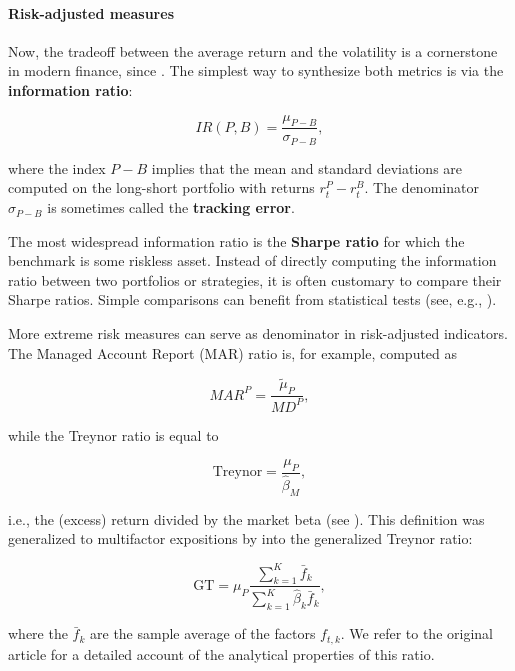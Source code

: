 \paragraph{Risk-adjusted measures}

Now, the tradeoff between the average return and the volatility is a cornerstone in modern finance, since \cite{markowitz1952portfolio}. The simplest way to synthesize both metrics is via the \textbf{information ratio}:

\begin{equation}
IR(P,B)=\frac{\mu_{P-B}}{\sigma_{P-B}},
\end{equation}

where the index $P -B$ implies that the mean and standard deviations are computed on the long-short portfolio with returns $r_t^P -r_t^B$. The denominator $\sigma_{P -B}$ is sometimes called the \textbf{tracking error}.

The most widespread information ratio is the \textbf{Sharpe ratio} \citep{sharpe1966mutual} for which the benchmark is some riskless asset. Instead of directly computing the information ratio between two portfolios or strategies, it is often customary to compare their Sharpe ratios. Simple comparisons can benefit from statistical tests (see, e.g., \cite{ledoit2008robust}).

More extreme risk measures can serve as denominator in risk-adjusted indicators. The Managed Account Report (MAR) ratio is, for example, computed as

\begin{equation}
MAR^P = \frac{\tilde{\mu}_P}{MD^P},
\end{equation}

while the Treynor ratio is equal to

\begin{equation}
\text{Treynor}=\frac{\mu_P}{\hat{\beta}_M},
\end{equation}

i.e., the (excess) return divided by the market beta (see \cite{treynor1965rate}). This definition was generalized to multifactor expositions by \cite{hubner2005generalized} into the generalized Treynor ratio:

\begin{equation}
\text{GT}=\mu_P\frac{\sum_{k=1}^K\bar{f}_k}{\sum_{k=1}^K\hat{\beta}_k\bar{f}_k},
\end{equation}

where the $\bar{f}_k$ are the sample average of the factors $f_{t,k}$. We refer to the original article for a detailed account of the analytical properties of this ratio.


